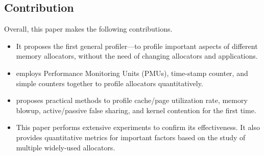 
\subsection*{Contribution}

Overall, this paper makes the following contributions. 

\begin{itemize}
\item It proposes the first general profiler--\MP{}--to profile important aspects of different memory allocators, without the need of changing allocators and applications.  

\item \MP{} employs Performance Monitoring Units (PMUs), time-stamp counter, and simple counters together to profile allocators quantitatively. 

\item \MP{} proposes practical methods to profile cache/page utilization rate, memory blowup, active/passive false sharing, and kernel contention for the first time.
 
\item This paper performs extensive experiments to confirm its effectiveness. It also provides quantitative metrics for important factors based on the study of multiple widely-used allocators.    

\end{itemize} 

